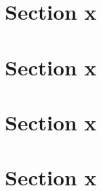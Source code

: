 \documentclass{article}
\begin{document}
\section*{Section x}

\section*{Section x}

\section*{Section x}

\section*{Section x}
\end{document}
